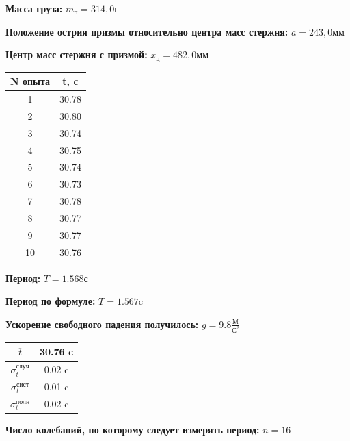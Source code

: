 \documentclass[a4paper, 12pt]{article}
\begin{document}
\noindent \textbf{Масса груза:} $m_{\text{п}}=314,0\text{г}$

\noindent \textbf{Положение острия призмы относительно центра масс стержня:} $a=243,0\text{мм}$

\noindent \textbf{Центр масс стержня с призмой:} $x_{\text{ц}}=482,0\text{мм}$

\begin{table}[!h]
\begin{center}
\begin{tabular}{|c|c|}
\hline
N опыта & t, c \\ \hline
1	& 30.78 \\ \hline
2	& 30.80 \\ \hline
3	& 30.74 \\ \hline
4	& 30.75 \\ \hline
5	& 30.74 \\ \hline
6	& 30.73 \\ \hline
7	& 30.78 \\ \hline
8	& 30.77 \\ \hline
9	& 30.77 \\ \hline
10	& 30.76 \\ \hline
\end{tabular}
\end{center}
\end{table}

\noindent \textbf{Период:} $T=1.568\text{с}$

\noindent \textbf{Период по формуле:} $T=1.567\text{c}$

\noindent \textbf{Ускорение свободного падения получилось:} $g=9.8\frac{\text{М}}{\text{С}^2}$

\begin{table}[!h]
\begin{center}
\begin{tabular}{|c|c|}
\hline
$\overline{t}$ & 30.76 c \\ \hline
$\sigma_{t}^{\text{случ}}$ & 0.02 c \\ \hline
$\sigma_{t}^{\text{сист}}$ & 0.01 c \\ \hline
$\sigma_{t}^{\text{полн}}$ & 0.02 c \\ \hline
\end{tabular}
\end{center}
\end{table}

\noindent \textbf{Число колебаний, по которому следует измерять период:} $n=16$

\newpage
\end{document}
